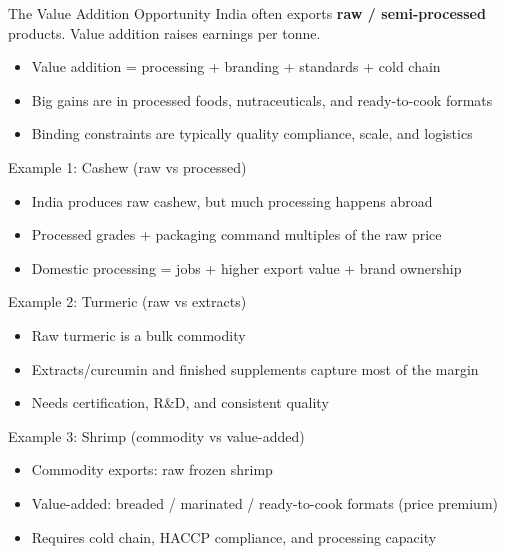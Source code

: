 \documentclass[
  ignorenonframetext,
  aspectratio=169,
]{beamer}
\makeatletter
\providecommand{\tightlist}{%
  \setlength{\itemsep}{0pt}\setlength{\parskip}{0pt}}
\let\quarto@originallabel\label
\DeclareRobustCommand*{\label}[1]{\quarto@originallabel{#1}}
\makeatother
\begin{document}
\begin{frame}
\begin{block}{The Value Addition Opportunity}
\label{the-value-addition-opportunity}
India often exports \textbf{raw / semi-processed} products. Value
addition raises earnings per tonne.

\begin{itemize}
\tightlist
\item
  Value addition = processing + branding + standards + cold chain
\item
  Big gains are in processed foods, nutraceuticals, and ready-to-cook
  formats
\item
  Binding constraints are typically quality compliance, scale, and
  logistics
\end{itemize}
\end{block}
\end{frame}

\begin{frame}
\begin{block}{Example 1: Cashew (raw vs processed)}
\label{example-1-cashew-raw-vs-processed}
\begin{itemize}
\tightlist
\item
  India produces raw cashew, but much processing happens abroad
\item
  Processed grades + packaging command multiples of the raw price
\item
  Domestic processing = jobs + higher export value + brand ownership
\end{itemize}
\end{block}
\end{frame}

\begin{frame}
\begin{block}{Example 2: Turmeric (raw vs extracts)}
\label{example-2-turmeric-raw-vs-extracts}
\begin{itemize}
\tightlist
\item
  Raw turmeric is a bulk commodity
\item
  Extracts/curcumin and finished supplements capture most of the margin
\item
  Needs certification, R\&D, and consistent quality
\end{itemize}
\end{block}
\end{frame}

\begin{frame}
\begin{block}{Example 3: Shrimp (commodity vs value-added)}
\label{example-3-shrimp-commodity-vs-value-added}
\begin{itemize}
\tightlist
\item
  Commodity exports: raw frozen shrimp
\item
  Value-added: breaded / marinated / ready-to-cook formats (price
  premium)
\item
  Requires cold chain, HACCP compliance, and processing capacity
\end{itemize}
\end{block}
\end{frame}
\end{document}
